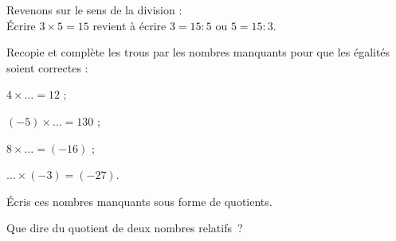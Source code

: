 
\begin{activite}

Revenons sur le sens de la division : \\[0.5em]
Écrire $3 \times 5 = 15$ revient à écrire $3 = 15 : 5$ ou $5 = 15 : 3$.
       
\begin{partie}
Recopie et complète les trous par les nombres manquants pour que les égalités soient correctes :
\begin{colenumerate}{4}
 \item $4 \times  \ldots = 12$ ;
 \item $(-5) \times  \ldots = 130$ ;
 \item $8 \times  \ldots = (-16)$ ;
 \item $ \ldots \times (-3) = (-27)$.
 \end{colenumerate}
\end{partie}

\begin{partie}
Écris ces nombres manquants sous forme de quotients.
\end{partie}

\begin{partie}
Que dire du quotient de deux nombres relatifs ?
\end{partie}

\end{activite}

